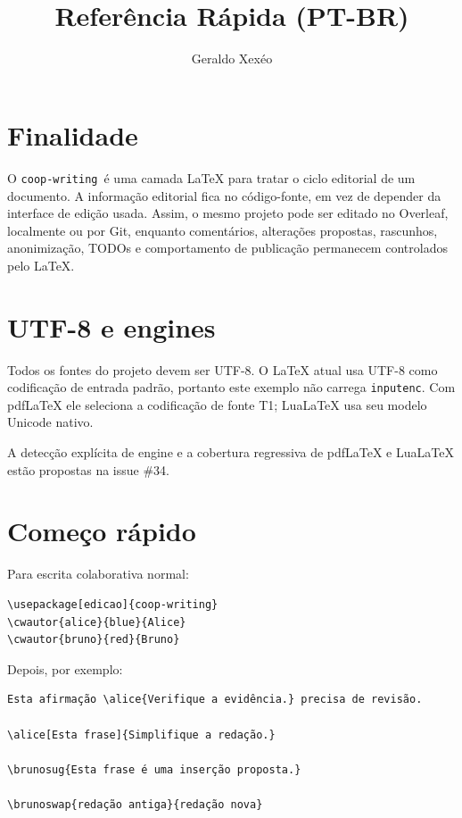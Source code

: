 \documentclass[11pt]{article}
\title{\pkg\ \coopwritingversion\\Referência Rápida (PT-BR)}
\author{Geraldo Xexéo}
\date{}
\newcommand{\pkg}{\texttt{coop-writing}}
\begin{document}
\maketitle

\section*{Finalidade}

O \pkg\ é uma camada LaTeX para tratar o ciclo editorial de um documento. A informação editorial fica no código-fonte, em vez de depender da interface de edição usada. Assim, o mesmo projeto pode ser editado no Overleaf, localmente ou por Git, enquanto comentários, alterações propostas, rascunhos, anonimização, TODOs e comportamento de publicação permanecem controlados pelo LaTeX.

\section*{UTF-8 e engines}

Todos os fontes do projeto devem ser UTF-8. O LaTeX atual usa UTF-8 como codificação de entrada padrão, portanto este exemplo não carrega \texttt{inputenc}. Com pdfLaTeX ele seleciona a codificação de fonte T1; LuaLaTeX usa seu modelo Unicode nativo.

A detecção explícita de engine e a cobertura regressiva de pdfLaTeX e LuaLaTeX estão propostas na issue \#34.

\section*{Começo rápido}

Para escrita colaborativa normal:

\begin{verbatim}
\usepackage[edicao]{coop-writing}
\cwautor{alice}{blue}{Alice}
\cwautor{bruno}{red}{Bruno}
\end{verbatim}

Depois, por exemplo:

\begin{verbatim}
Esta afirmação \alice{Verifique a evidência.} precisa de revisão.

\alice[Esta frase]{Simplifique a redação.}

\brunosug{Esta frase é uma inserção proposta.}

\brunoswap{redação antiga}{redação nova}
\end{verbatim}
\end{document}
